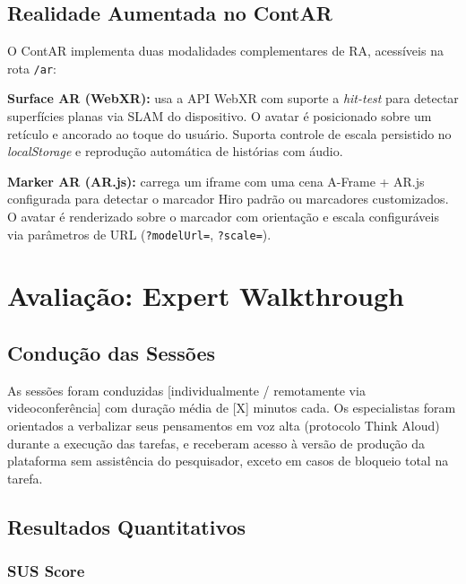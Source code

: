 \documentclass[
  12pt,
  openright,
  twoside,
  a4paper,
  english,
  brazil
]{abntex2}
\begin{document}
\section{Realidade Aumentada no ContAR}
\label{sec:ar-contar}

O ContAR implementa duas modalidades complementares de RA, acessíveis
na rota \texttt{/ar}:

\textbf{Surface AR (WebXR):} usa a API WebXR com suporte a
\textit{hit-test} para detectar superfícies planas via SLAM do
dispositivo. O avatar é posicionado sobre um retículo e ancorado ao
toque do usuário. Suporta controle de escala persistido no
\textit{localStorage} e reprodução automática de histórias com áudio.

\textbf{Marker AR (AR.js):} carrega um iframe com uma cena A-Frame + AR.js
configurada para detectar o marcador Hiro padrão ou marcadores
customizados. O avatar é renderizado sobre o marcador com orientação e
escala configuráveis via parâmetros de URL (\texttt{?modelUrl=},
\texttt{?scale=}).


\chapter{Avaliação: Expert Walkthrough}
\label{cap:avaliacao}

\section{Condução das Sessões}
\label{sec:conducao}

As sessões foram conduzidas [individualmente / remotamente via videoconferência]
com duração média de [X] minutos cada. Os especialistas foram orientados a
verbalizar seus pensamentos em voz alta (protocolo Think Aloud) durante
a execução das tarefas, e receberam acesso à versão de produção da
plataforma sem assistência do pesquisador, exceto em casos de bloqueio
total na tarefa.

\section{Resultados Quantitativos}
\label{sec:resultados-quant}

\subsection{SUS Score}
\label{subsec:sus}
\end{document}
